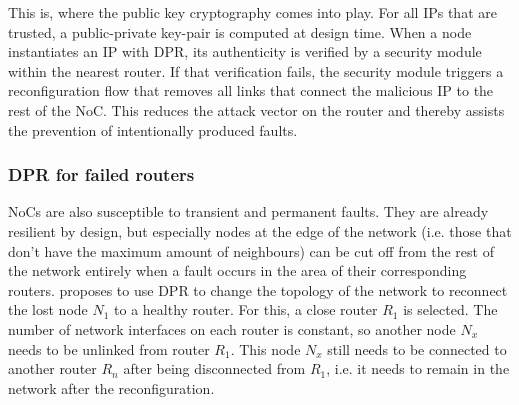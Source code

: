 This is, where the public key cryptography comes into play. 
For all \glspl{IP} that are trusted, a public-private key-pair is computed at design time. 
When a node instantiates an \gls{IP} with \gls{DPR}, its authenticity is verified by a security module within the nearest router. 
If that verification fails, the security module triggers a reconfiguration flow that removes all links that connect the malicious \gls{IP} to the rest of the \gls{NoC}.
This reduces the attack vector on the router and thereby assists the prevention of intentionally produced faults. 

\subsubsection{\gls{DPR} for failed routers}\label{sec:failedRouters}
\glspl{NoC} are also susceptible to transient and permanent faults. 
They are already resilient by design, but especially nodes at the edge of the network (i.e. those that don't have the maximum amount of neighbours) can be cut off from the rest of the network entirely when a fault occurs in the area of their corresponding routers. 
\cite{wehbe_secure_2016} proposes to use \gls{DPR} to change the topology of the network to reconnect the lost node $N_1$ to a healthy router.
For this, a close router $R_1$ is selected. 
The number of network interfaces on each router is constant, so another node $N_x$ needs to be unlinked from router $R_1$. 
This node $N_x$ still needs to be connected to another router $R_n$ after being disconnected from $R_1$, i.e. it needs to remain in the network after the reconfiguration.

